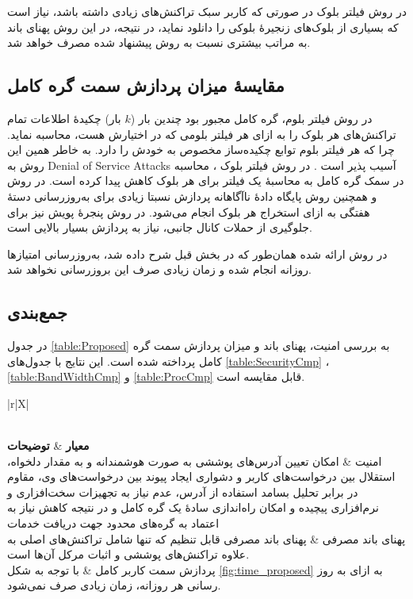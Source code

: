 در روش فیلتر بلوک \cite{Osuntokun2017} در صورتی که کاربر سبک تراکنش‌های زیادی داشته باشد، نیاز است که بسیاری از بلوک‌های زنجیرهٔ بلوکی را دانلود نماید، در نتیجه، در این روش پهنای باند به مراتب بیشتری نسبت به روش پیشنهاد شده مصرف خواهد شد.

\subsection{مقایسهٔ میزان پردازش سمت گره کامل }
در روش‌ فیلتر بلوم\cite{Hearn2013}، گره کامل مجبور بود چندین بار ($k$ بار) چکیدهٔ اطلاعات تمام تراکنش‌های هر بلوک را به ازای هر فیلتر بلومی که در اختیارش هست، محاسبه نماید. چرا که هر فیلتر بلوم توابع چکیده‌ساز مخصوص به خودش را دارد. به خاطر همین این روش به
\glspl{Denial of Service Attack}
آسیب پذیر است \cite{PeterTodd}.
 در روش فیلتر بلوک \cite{Osuntokun2017}، محاسبه در سمک گره کامل به محاسبهٔ یک فیلتر برای هر بلوک کاهش پیدا کرده است. در روش \cite{Qin2019} و همچنین روش پایگاه دادهٔ ناآگاهانه \cite{Matetic2019} پردازش نسبتا زیادی برای به‌روزرسانی دستهٔ هفتگی به ازای استخراج هر بلوک انجام می‌شود. در روش پنجرهٔ پویش \cite{Matetic2019} نیز برای جلوگیری از حملات کانال جانبی، نیاز به پردازش بسیار بالایی است.
 
 در روش ارائه شده همان‌طور که در بخش قبل شرح داده شد، به‌روزرسانی امتیازها روزانه انجام شده و زمان زیادی صرف این بروزرسانی نخواهد شد.

\subsection{جمع‌بندی}
در جدول \ref{table:Proposed} به بررسی امنیت، پهنای باند و میزان پردازش سمت گره کامل پرداخته شده است. این نتایج با جدول‌های \ref{table:SecurityCmp} ،\ref{table:BandWidthCmp} و \ref{table:ProcCmp} قابل مقایسه است.

\begin{xltabular}{\textwidth}{|r|X|}
	\caption{
		بررسی  امنیت، پهنای باند و پردازش سمت گره کامل برای روش ارائه شده
		\label{table:Proposed}}\\
	\hline
	\textbf{معیار} & \textbf{توضیحات} \\
	\hline
	{%
		امنیت
	}&{%
		امکان تعیین آدرس‌های پوششی به صورت هوشمندانه و به مقدار دلخواه، استقلال بین درخواست‌های کاربر و دشواری ایجاد پیوند بین درخواست‌های وی، مقاوم در برابر تحلیل بسامد استفاده از آدرس، عدم نیاز به تجهیزات سخت‌افزاری و نرم‌افزاری پیچیده و امکان راه‌اندازی ساده‌ٔ یک گره کامل و در نتیجه کاهش نیاز به اعتماد به گره‌های محدود جهت دریافت خدمات
	}\\
	\hline
	{%
		پهنای باند مصرفی
	}&{%
		پهنای باند مصرفی قابل تنظیم که تنها شامل تراکنش‌های اصلی به علاوه تراکنش‌های پوششی و اثبات مرکل آن‌ها است.
	}\\
	\hline
	{%
		پردازش سمت کاربر کامل
	} & {%
		با توجه به شکل \ref{fig:time_proposed} به ازای به روز رسانی هر روزانه، زمان زیادی صرف نمی‌شود.
	}\\
	\hline
	
\end{xltabular}





